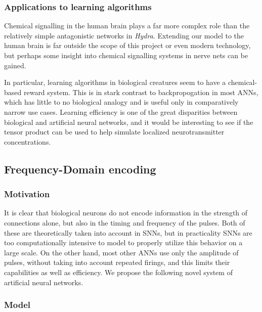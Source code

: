 \documentclass{article}
\begin{document}

\subsubsection{Applications to learning algorithms}

Chemical signalling in the human brain plays a far more complex role than the relatively simple antagonistic networks in \textit{Hydra}. Extending our model to the human brain is far outside the scope of this project or even modern technology, but perhaps some insight into chemical signalling systems in nerve nets can be gained.

In particular, learning algorithms in biological creatures seem to have a chemical-based reward system. This is in stark contrast to backpropogation in most ANNs, which has little to no biological analogy and is useful only in comparatively narrow use cases. Learning efficiency is one of the great disparities between biological and artificial neural networks, and it would be interesting to see if the tensor product can be used to help simulate localized neurotransmitter concentrations.


\newpage

\subsection{Frequency-Domain encoding}

\subsubsection{Motivation}

It is clear that biological neurons do not encode information in the strength of connections alone, but also in the timing and frequency of the pulses. Both of these are theoretically taken into account in SNNs, but in practicality SNNs are too computationally intensive to model to properly utilize this behavior on a large scale. On the other hand, most other ANNs use only the amplitude of pulses, without taking into account repeated firings, and this limits their capabilities as well as efficiency. We propose the following novel system of artificial neural networks.

\subsubsection{Model}
\end{document}
